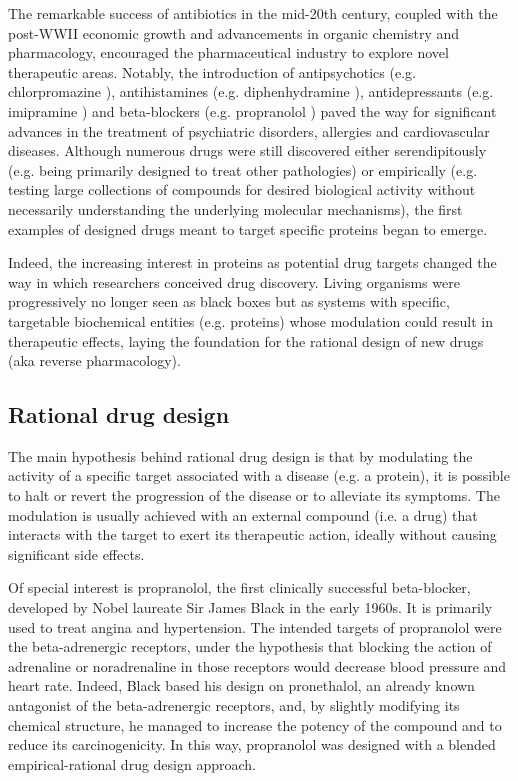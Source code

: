 The remarkable success of antibiotics in the mid-20th century, coupled with the post-WWII economic growth and advancements in organic chemistry and pharmacology, encouraged the pharmaceutical industry to explore novel therapeutic areas. Notably, the introduction of antipsychotics (e.g. chlorpromazine \cite{ban_fifty_2007}), antihistamines (e.g. diphenhydramine \cite{simons_histamine_2011}), antidepressants (e.g. imipramine \cite{brown_clinical_2015}) and beta-blockers (e.g. propranolol \cite{srinivasan_propranolol_2019}) paved the way for significant advances in the treatment of psychiatric disorders, allergies and cardiovascular diseases. Although numerous drugs were still discovered either serendipitously (e.g. being primarily designed to treat other pathologies) or empirically (e.g. testing large collections of compounds for desired biological activity without necessarily understanding the underlying molecular mechanisms), the first examples of designed drugs meant to target specific proteins began to emerge\cite{drews_drug_2000}.

Indeed, the increasing interest in proteins as potential drug targets changed the way in which researchers conceived drug discovery. Living organisms were progressively no longer seen as black boxes but as systems with specific, targetable biochemical entities (e.g. proteins) whose modulation could result in therapeutic effects, laying the foundation for the rational design of new drugs (aka reverse pharmacology). 

\subsection{Rational drug design}
\label{Introduction_rational}

The main hypothesis behind rational drug design is that by modulating the activity of a specific target associated with a disease (e.g. a protein), it is possible to halt or revert the progression of the disease or to alleviate its symptoms. The modulation is usually achieved with an external compound (i.e. a drug) that interacts with the target to exert its therapeutic action, ideally without causing significant side effects.

Of special interest is propranolol, the first clinically successful beta-blocker, developed by Nobel laureate Sir James Black in the early 1960s. It is primarily used to treat angina and hypertension\cite{srinivasan_propranolol_2019}. The intended targets of propranolol were the beta-adrenergic receptors, under the hypothesis that blocking the action of adrenaline or noradrenaline in those receptors would decrease blood pressure and heart rate. Indeed, Black based his design on pronethalol, an already known antagonist of the beta-adrenergic receptors, and, by slightly modifying its chemical structure, he managed to increase the potency of the compound and to reduce its carcinogenicity\cite{black_new_1964}. In this way, propranolol was designed with a blended empirical-rational drug design approach.

